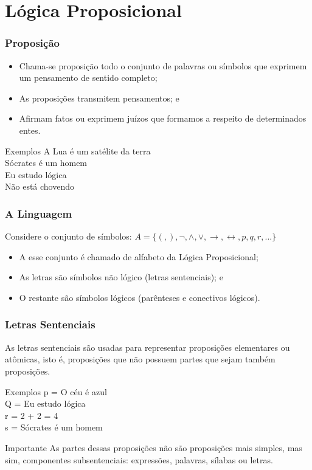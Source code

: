 \documentclass[aspectratio=169]{beamer} %
\begin{document}
\section{Lógica Proposicional}

\begin{frame}
\frametitle{Proposição}

\begin{itemize}
	\item Chama-se proposição todo o conjunto de palavras ou símbolos que exprimem um pensamento de sentido completo;
	\item As proposições transmitem pensamentos; e
	\item Afirmam fatos ou exprimem juízos que formamos a respeito de determinados entes.
\end{itemize}\vfill

\begin{exampleblock}{Exemplos}
A Lua é um satélite da terra\\
Sócrates é um homem\\
Eu estudo lógica\\
Não está chovendo
\end{exampleblock}
\end{frame}

\begin{frame}
\frametitle{A Linguagem}

\begin{block}{Considere o conjunto de símbolos:}
$ A = \{(,), \neg, \wedge, \vee, \rightarrow, \leftrightarrow, p, q, r, ... \}$
\end{block}\vfill

\begin{itemize}
	\item A esse conjunto é chamado de alfabeto da Lógica Proposicional;
	\item As letras são símbolos não lógico (letras sentenciais); e
	\item O restante são símbolos lógicos (parênteses e conectivos lógicos).
\end{itemize}
\end{frame}

\begin{frame}
\frametitle{Letras Sentenciais}

As letras sentenciais são usadas para representar proposições elementares ou atômicas, isto é, proposições que não possuem partes que sejam também proposições.
\vfill
\begin{exampleblock}{Exemplos}
p = O céu é azul\\
Q = Eu estudo lógica\\
r = 2 + 2 = 4\\
s = Sócrates é um homem
\end{exampleblock} \vfill

\begin{alertblock}{Importante}
As partes dessas proposições não são proposições mais simples, mas sim, componentes subsentenciais: expressões, palavras, sílabas ou letras.
\end{alertblock}
\end{frame}
\end{document}
